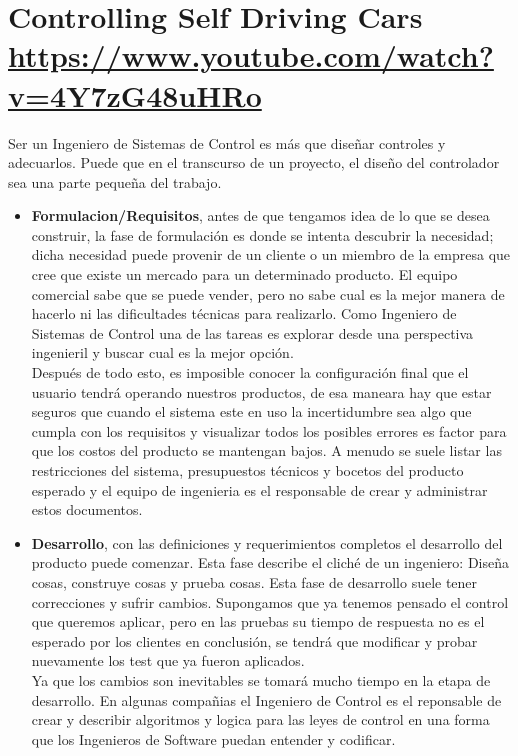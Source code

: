 \documentclass[
	12pt, %
]{fphw}
\begin{document}
\newpage
\section*{{\color{RoyalPurple}Controlling Self Driving Cars} \url{https://www.youtube.com/watch?v=4Y7zG48uHRo}}

Ser un Ingeniero de Sistemas de Control es más que diseñar controles y adecuarlos. Puede que en el transcurso de un proyecto, el diseño del controlador sea una parte pequeña del trabajo. 
\begin{itemize}

\item \textbf{Formulacion/Requisitos}, antes de que tengamos idea de lo que se desea construir, la fase de formulación es donde se intenta descubrir la necesidad; dicha necesidad puede provenir de un cliente o un miembro de la empresa que cree que existe un mercado para un determinado producto. El equipo comercial sabe que se puede vender, pero no sabe cual es la mejor manera de hacerlo ni las dificultades técnicas para realizarlo. Como Ingeniero de Sistemas de Control una de las tareas es explorar desde una perspectiva ingenieril y buscar cual es la mejor opción. \\
Después de todo esto, es imposible conocer la configuración final que el usuario tendrá operando nuestros productos, de esa maneara hay que estar seguros que cuando el sistema este en uso la incertidumbre sea algo que cumpla con los requisitos y visualizar todos los posibles errores es factor para que los costos del producto se mantengan bajos. A menudo se suele listar las restricciones del sistema, presupuestos técnicos y bocetos del producto esperado y el equipo de ingenieria es el responsable de crear y administrar estos documentos.

\item \textbf{Desarrollo}, con las definiciones y requerimientos completos el desarrollo del producto puede comenzar. Esta fase describe el cliché de un ingeniero: Diseña cosas, construye cosas y prueba cosas. Esta fase de desarrollo suele tener correcciones y sufrir cambios. Supongamos que ya tenemos pensado el control que queremos aplicar, pero en las pruebas su tiempo de respuesta no es el esperado por los clientes en conclusión, se tendrá que modificar y probar nuevamente los test que ya fueron aplicados.\\

  Ya que los cambios son inevitables se tomará mucho tiempo en la etapa de desarrollo. En algunas compañias el Ingeniero de Control es el reponsable de crear y describir algoritmos y logica para las leyes de control en una forma que los Ingenieros de Software puedan entender y codificar.
  

\end{itemize}
\end{document}
